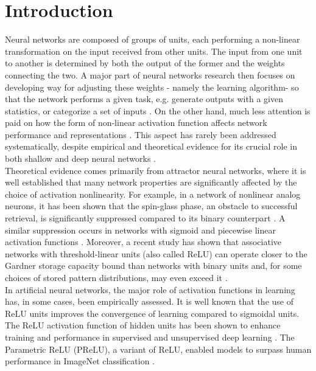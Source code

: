 \documentclass[11pt,letterpaper]{article}
\renewcommand{\red}[1]{#1}
\begin{document}
\section{Introduction}
Neural networks are composed of groups of units, each performing a non-linear transformation on the input received from other units. The input from one unit to another is determined by both the output of the former and the weights connecting the two. A major part of neural networks research then focuses on developing way for adjusting these weights - namely the learning algorithm- so that the network performs a given task, e.g. generate outputs with a given statistics, or categorize a set of inputs \cite{allen2019learning, arora2019fine, allen2019convergence, chatterjee2022generalization, oymak2020toward,li2018learning}. On the other hand, much less attention is paid on how the form of non-linear activation function affects network performance and representations \cite{diSarra_2025}. This aspect has rarely been addressed systematically, despite empirical and theoretical evidence for its crucial role in {\red both shallow and deep} neural networks {\red \cite{10.5555/3104322.3104425,pmlr-v15-glorot11a, krizhevsky2012imagenet, ramachandran2017searching, hendrycks2016gaussian}}.\\
Theoretical evidence comes primarily from attractor neural networks, where it is well established that many network properties are significantly affected by the choice of activation nonlinearity. For example,
in a network of nonlinear analog neurons, it has been shown that the spin-glass phase, an obstacle to successful retrieval, is significantly suppressed compared to its binary counterpart \cite{PhysRevA.42.7459}. A similar suppression occurs in networks with sigmoid and piecewise linear activation functions \cite{PhysRevA.43.2084,PhysRevA.42.2418,PhysRevE.73.061904,Treves_1990}.
Moreover, a recent study has shown that associative networks with threshold-linear units (also called ReLU) can operate closer to the Gardner storage capacity bound than networks with binary units and, for some choices of stored pattern distributions, may even exceed it \cite{PhysRevLett.126.018301}.\\
In artificial neural networks, the major role of activation functions in learning has, in some cases, been empirically assessed. It is well known that the use of ReLU units improves the convergence of learning compared to sigmoidal units. The ReLU activation function of hidden units has been shown to enhance training and performance in supervised and unsupervised deep learning \cite{pmlr-v15-glorot11a}. The Parametric ReLU (PReLU), a variant of ReLU, enabled models to surpass human performance in ImageNet classification \cite{7410480}.
\end{document}
